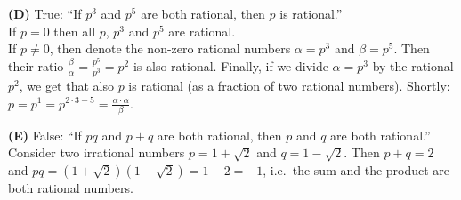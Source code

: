 \documentclass[jou]{apa6}
\begin{document}
{\bf (D)} True: ``If $p^3$ and $p^5$ are both rational, then $p$ is rational.''\\
If $p = 0$ then all $p$, $p^3$ and $p^5$ are rational.\\
If $p \neq 0$, then denote the non-zero rational numbers $\alpha = p^3$ and $\beta = p^5$. 
Then their ratio $\frac{\beta}{\alpha} = \frac{p^5}{p^3} = p^2$ is also rational. 
Finally, if we divide $\alpha = p^3$ by the rational $p^2$, we get that also $p$ is rational 
(as a fraction of two rational numbers). Shortly: $p = p^1 = p^{2 \cdot 3 - 5} = \frac{ \alpha \cdot \alpha}{\beta}$. 

{\bf (E)} False: ``If $pq$ and $p+q$ are both rational, then $p$ and $q$ are both rational.''\\
Consider two irrational numbers $p = 1 + \sqrt{2}$ and $q = 1 - \sqrt{2}$. Then $p + q = 2$ and
$pq = (1 + \sqrt{2})(1 - \sqrt{2}) = 1 -2 = -1$, i.e.\ the sum and the product are both rational numbers.
\end{document}
